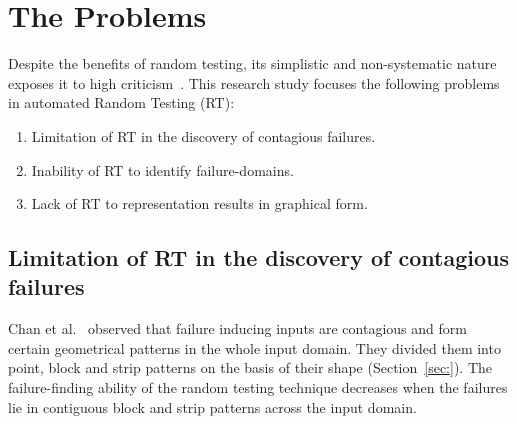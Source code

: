 \section{The Problems}
Despite the benefits of random testing, its simplistic and non-systematic nature exposes it to high criticism~\cite{white1987software, myers2011art}. This research study focuses the following problems in automated Random Testing (RT):


\begin{enumerate}
\item Limitation of RT in the discovery of contagious failures.
\item Inability of RT to identify failure-domains.
\item Lack of RT to representation results in graphical form. 
\end{enumerate}

\subsection{Limitation of RT in the discovery of contagious failures}
Chan et al.~\cite{chan1996proportional} observed that failure inducing inputs are contagious and form certain geometrical patterns in the whole input domain. They divided them into point, block and strip patterns on the basis of their shape (Section~\ref{sec:}). %
The failure-finding ability of the random testing technique decreases when the failures lie in contiguous block and strip patterns across the input domain.


